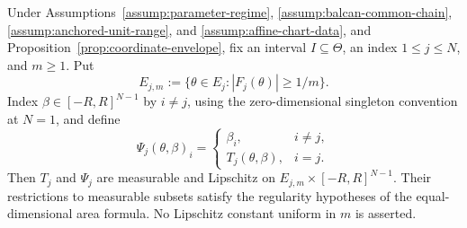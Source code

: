 \begin{lemma}
\label{lem:finite-chart-legality}
Under Assumptions~\ref{assump:parameter-regime},
\ref{assump:balcan-common-chain},
\ref{assump:anchored-unit-range}, and
\ref{assump:affine-chart-data}, and
Proposition~\ref{prop:coordinate-envelope}, fix an interval
$I\subseteq\Theta$, an index $1\leq j\leq N$, and $m\geq1$.  Put
\[
E_{j,m}:=\{\theta\in E_j:|F_j(\theta)|\geq1/m\}.
\]
Index $\beta\in[-R,R]^{N-1}$ by $i\neq j$, using the zero-dimensional
singleton convention at $N=1$, and define
\[
\Psi_j(\theta,\beta)_i=
\begin{cases}
\beta_i,&i\neq j,\\
T_j(\theta,\beta),&i=j.
\end{cases}
\]
Then $T_j$ and $\Psi_j$ are measurable and Lipschitz on
$E_{j,m}\times[-R,R]^{N-1}$.  Their restrictions to measurable subsets
satisfy the regularity hypotheses of the equal-dimensional area formula.  No
Lipschitz constant uniform in $m$ is asserted.
\end{lemma}

